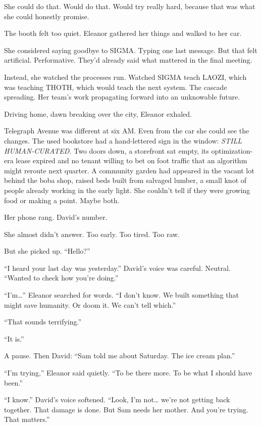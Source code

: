She could do that. Would do that. Would try really hard, because that was what she could honestly promise.

The booth felt too quiet. Eleanor gathered her things and walked to her car.

\scenebreak

She considered saying goodbye to SIGMA. Typing one last message. But that felt artificial. Performative. They'd already said what mattered in the final meeting.

Instead, she watched the processes run. Watched SIGMA teach LAOZI, which was teaching THOTH, which would teach the next system. The cascade spreading. Her team's work propagating forward into an unknowable future.

\scenebreak

Driving home, dawn breaking over the city, Eleanor exhaled.

Telegraph Avenue was different at six AM. Even from the car she could see the changes. The used bookstore had a hand-lettered sign in the window: \emph{STILL HUMAN-CURATED.} Two doors down, a storefront sat empty, its optimization-era lease expired and no tenant willing to bet on foot traffic that an algorithm might reroute next quarter. A community garden had appeared in the vacant lot behind the boba shop, raised beds built from salvaged lumber, a small knot of people already working in the early light. She couldn't tell if they were growing food or making a point. Maybe both.

\scenebreak

Her phone rang. David's number.

She almost didn't answer. Too early. Too tired. Too raw.

But she picked up. ``Hello?''

``I heard your last day was yesterday.'' David's voice was careful. Neutral. ``Wanted to check how you're doing.''

``I'm\ldots{}'' Eleanor searched for words. ``I don't know. We built something that might save humanity. Or doom it. We can't tell which.''

``That sounds terrifying.''

``It is.''

A pause. Then David: ``Sam told me about Saturday. The ice cream plan.''

``I'm trying,'' Eleanor said quietly. ``To be there more. To be what I should have been.''

``I know.'' David's voice softened. ``Look, I'm not\ldots{} we're not getting back together. That damage is done. But Sam needs her mother. And you're trying. That matters.''

